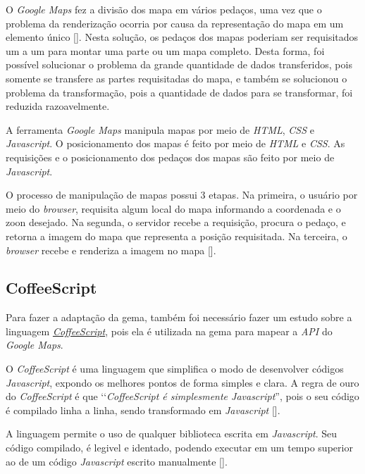O \emph{Google Maps} fez a divisão dos mapa em vários pedaços, uma vez que o problema da renderização
ocorria por causa da representação do mapa em um elemento único
[]. Nesta solução, os pedaços dos mapas
poderiam ser requisitados um a um para montar uma parte ou um mapa completo. Desta forma, foi possível
solucionar o problema da grande quantidade de dados transferidos, pois somente se transfere as partes
requisitadas do mapa, e também se solucionou o problema da transformação, pois a quantidade de dados
para se transformar, foi reduzida razoavelmente.

A ferramenta \emph{Google Maps} manipula mapas por meio de \emph{HTML}, \emph{CSS} e \emph{Javascript}.
O posicionamento dos mapas é feito por meio de \emph{HTML} e \emph{CSS}. As requisições e o posicionamento
dos pedaços dos mapas são feito por meio de \emph{Javascript}.

O processo de manipulação de mapas possui 3 etapas. Na primeira, o usuário por meio do \emph{browser},
requisita algum local do mapa informando a coordenada e o zoon desejado. Na segunda, o servidor recebe
a requisição, procura o pedaço, e retorna a imagem do mapa que representa a posição requisitada. Na
terceira, o \emph{browser} recebe e renderiza a imagem no mapa [].


\subsection{CoffeeScript}
\label{subsection:coffeescript}


Para fazer a adaptação da gema, também foi necessário fazer um estudo sobre a linguagem
\emph{\href{http://coffeescript.org/}{CoffeeScript}}, pois ela é utilizada na gema para
mapear a \emph{API} do \emph{Google Maps}.

O \emph{CoffeeScript} é uma linguagem que simplifica o modo de desenvolver códigos \emph{Javascript},
expondo os melhores pontos de forma simples e clara. A regra de ouro do \emph{CoffeeScript}
é que ‘‘\emph{CoffeeScript é simplesmente Javascript}'', pois o seu código é compilado linha a linha,
sendo transformado em \emph{Javascript} [].

A linguagem permite o uso de qualquer biblioteca escrita em \emph{Javascript}. Seu código compilado,
é legivel e identado, podendo executar em um tempo superior ao de um código \emph{Javascript} escrito
manualmente [].

